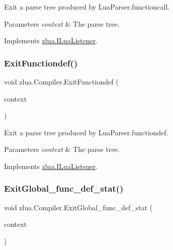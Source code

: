 Exit a parse tree produced by Lua\+Parser.\+functioncall. 


\begin{DoxyParams}{Parameters}
{\em context} & The parse tree.\\
\hline
\end{DoxyParams}


Implements \mbox{\hyperlink{interfacezlua_1_1_i_lua_listener_acd0b2537f173e36443c60445ef23eeb6}{zlua.\+I\+Lua\+Listener}}.

\mbox{\label{classzlua_1_1_compiler_ac116526982cb40d063ff68949ab001e0}} 
\subsubsection{\texorpdfstring{Exit\+Functiondef()}{ExitFunctiondef()}}
{\footnotesize\ttfamily void zlua.\+Compiler.\+Exit\+Functiondef (\begin{DoxyParamCaption}\item[{\mbox{[}\+Not\+Null\mbox{]} \mbox{\hyperlink{classzlua_1_1_lua_parser_1_1_functiondef_context}{Lua\+Parser.\+Functiondef\+Context}}}]{context }\end{DoxyParamCaption})}



Exit a parse tree produced by Lua\+Parser.\+functiondef. 


\begin{DoxyParams}{Parameters}
{\em context} & The parse tree.\\
\hline
\end{DoxyParams}


Implements \mbox{\hyperlink{interfacezlua_1_1_i_lua_listener_a61203f381bc56ad4df13efd83138aeec}{zlua.\+I\+Lua\+Listener}}.

\mbox{\label{classzlua_1_1_compiler_a2d4b742668c3002d6396dca636a97dce}} 
\subsubsection{\texorpdfstring{Exit\+Global\+\_\+func\+\_\+def\+\_\+stat()}{ExitGlobal\_func\_def\_stat()}}
{\footnotesize\ttfamily void zlua.\+Compiler.\+Exit\+Global\+\_\+func\+\_\+def\+\_\+stat (\begin{DoxyParamCaption}\item[{\mbox{[}\+Not\+Null\mbox{]} \mbox{\hyperlink{classzlua_1_1_lua_parser_1_1_global__func__def__stat_context}{Lua\+Parser.\+Global\+\_\+func\+\_\+def\+\_\+stat\+Context}}}]{context }\end{DoxyParamCaption})}



